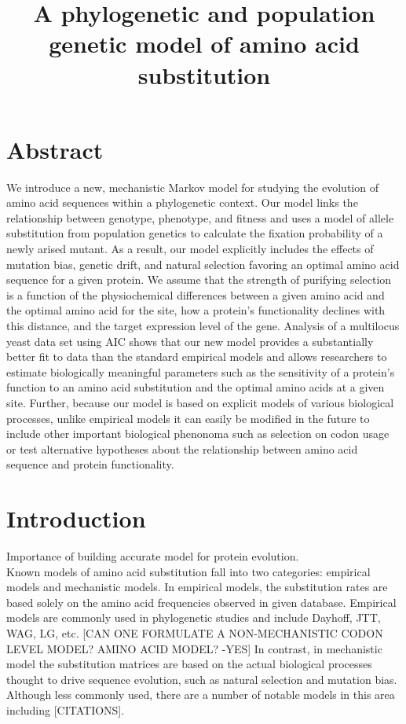 \documentclass[13pt]{article}
\title{A phylogenetic and population genetic model of amino acid substitution}
\author{}
\begin{document}
\maketitle
\section{Abstract}
We introduce a new, mechanistic Markov model for studying the evolution of amino acid sequences within a phylogenetic context.
Our model links the relationship between genotype, phenotype, and fitness and uses a model of allele substitution from population genetics to calculate the fixation probability of a newly arised mutant.
As a result, our model explicitly includes the effects of mutation bias, genetic drift, and natural selection favoring an optimal amino acid sequence for a given protein.
We assume that the strength of purifying selection is a function of the physiochemical differences between a given amino acid and the optimal amino acid for the site, how a protein's functionality declines with this distance, and the target expression level of the gene.
Analysis of a multilocus yeast data set using AIC shows that our new model provides a substantially better fit to data than the standard empirical models and allows researchers to estimate biologically meaningful parameters such as the sensitivity of a protein's function to an amino acid substitution and the optimal amino acids at a given site.
Further, because our model is based on explicit models of various biological processes, unlike empirical models it can easily be modified in the future to include other important biological phenonoma such as selection on codon usage or test alternative hypotheses about the relationship between amino acid sequence and protein functionality.


\section{Introduction}
Importance of building accurate model for protein evolution. \\

Known models of amino acid substitution fall into two categories: empirical models and mechanistic models. 
In empirical models, the substitution rates are based solely on the amino acid frequencies observed in given database.
Empirical models are commonly used in phylogenetic studies and include  Dayhoff, JTT, WAG, LG, etc. 
[CAN ONE FORMULATE A NON-MECHANISTIC CODON LEVEL MODEL? AMINO ACID MODEL?  -YES]
In contrast, in mechanistic model the substitution matrices are based on the actual biological processes thought to drive sequence evolution, such as natural selection and mutation bias.
Although less commonly used, there are a number of notable models in this area including [CITATIONS].
\end{document}
